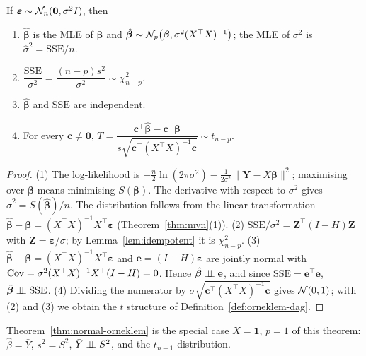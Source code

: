 \documentclass[main.tex]{subfiles}
\begin{document}
\begin{theorem}\label{thm:normal-dogrusal}
If $\bm\varepsilon\sim\mathcal{N}_n(\mathbf 0,\sigma^2I)$, then
\begin{enumerate}
  \item $\hat{\bm\beta}$ is the MLE of $\bm\beta$ and $\hat{\bm\beta}\sim\mathcal{N}_p\big(\bm\beta,\sigma^2(X^\top X)^{-1}\big)$; the MLE of $\sigma^2$ is $\hat\sigma^2=\mathrm{SSE}/n$.
  \item $\dfrac{\mathrm{SSE}}{\sigma^2}=\dfrac{(n-p)s^2}{\sigma^2}\sim\chi^2_{n-p}$.
  \item $\hat{\bm\beta}$ and $\mathrm{SSE}$ are independent.
  \item For every $\mathbf c\ne\mathbf 0$, $T=\dfrac{\mathbf c^\top\hat{\bm\beta}-\mathbf c^\top\bm\beta}{s\sqrt{\mathbf c^\top(X^\top X)^{-1}\mathbf c}}\sim t_{n-p}$.
\end{enumerate}
\end{theorem}
\begin{proof}
(1) The log-likelihood is $-\frac n2\ln(2\pi\sigma^2)-\frac{1}{2\sigma^2}\|\mathbf Y-X\bm\beta\|^2$; maximising over $\bm\beta$ means minimising $S(\bm\beta)$. The derivative with respect to $\sigma^2$ gives $\hat\sigma^2=S(\hat{\bm\beta})/n$. The distribution follows from the linear transformation $\hat{\bm\beta}-\bm\beta=(X^\top X)^{-1}X^\top\bm\varepsilon$ (Theorem~\ref{thm:mvn}(1)).
(2) $\mathrm{SSE}/\sigma^2=\mathbf Z^\top(I-H)\mathbf Z$ with $\mathbf Z=\bm\varepsilon/\sigma$; by Lemma~\ref{lem:idempotent} it is $\chi^2_{n-p}$.
(3) $\hat{\bm\beta}-\bm\beta=(X^\top X)^{-1}X^\top\bm\varepsilon$ and $\mathbf e=(I-H)\bm\varepsilon$ are jointly normal with $\operatorname{Cov}=\sigma^2(X^\top X)^{-1}X^\top(I-H)=0$. Hence $\hat{\bm\beta}\perp\!\!\!\perp\mathbf e$, and since $\mathrm{SSE}=\mathbf e^\top\mathbf e$, $\hat{\bm\beta}\perp\!\!\!\perp\mathrm{SSE}$.
(4) Dividing the numerator by $\sigma\sqrt{\mathbf c^\top(X^\top X)^{-1}\mathbf c}$ gives $\mathcal{N}(0,1)$; with (2) and (3) we obtain the $t$ structure of Definition~\ref{def:orneklem-dag}.
\end{proof}

\begin{remark}
Theorem~\ref{thm:normal-orneklem} is the special case $X=\mathbf 1$, $p=1$ of this theorem: $\hat\beta=\bar Y$, $s^2=S^2$, $\bar Y\perp\!\!\!\perp S^2$, and the $t_{n-1}$ distribution.
\end{remark}
\end{document}
